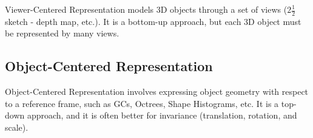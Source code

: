 \documentclass{article}
\begin{document}
\begin{multicols}{2}
Viewer-Centered Representation models 3D objects through a set of views ($2 \frac{1}{2}$ sketch - depth map, etc.). It is a bottom-up approach, but each 3D object must be represented by many views.

\subsection{Object-Centered Representation}

Object-Centered Representation involves expressing object geometry with respect to a reference frame, such as GCs, Octrees, Shape Histograms, etc. It is a top-down approach, and it is often better for invariance (translation, rotation, and scale).

\end{multicols}
\end{document}
